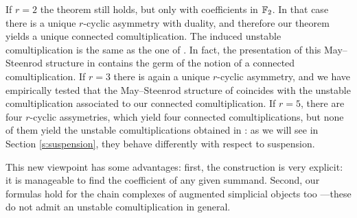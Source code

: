 If $r=2$ the theorem still holds, but only with coefficients in $\mathbb{F}_2$. In that case there is a unique $r$-cyclic asymmetry with duality, and therefore our theorem yields a unique connected comultiplication. The induced unstable comultiplication is the same as the one of \cite{medina2021may_st}. In fact, the presentation of this May--Steenrod structure in \cite{medina2021fast_sq} contains the germ of the notion of a connected comultiplication. If $r=3$ there is again a unique $r$-cyclic asymmetry, and we have empirically tested that the May--Steenrod structure of \cite{medina2021may_st} coincides with the unstable comultiplication associated to our connected comultiplication. If $r= 5$, there are four $r$-cyclic assymetries, which yield four connected comultiplications, but none of them yield the unstable comultiplications obtained in \cite{medina2021may_st}: as we will see in Section \ref{s:suspension}, they behave differently with respect to suspension.

This new viewpoint has some advantages: first, the construction is very explicit: it is manageable to find the coefficient of any given summand. %
Second, our formulas hold for the chain complexes of augmented simplicial objects too ---these do not admit an unstable comultiplication in general. %

